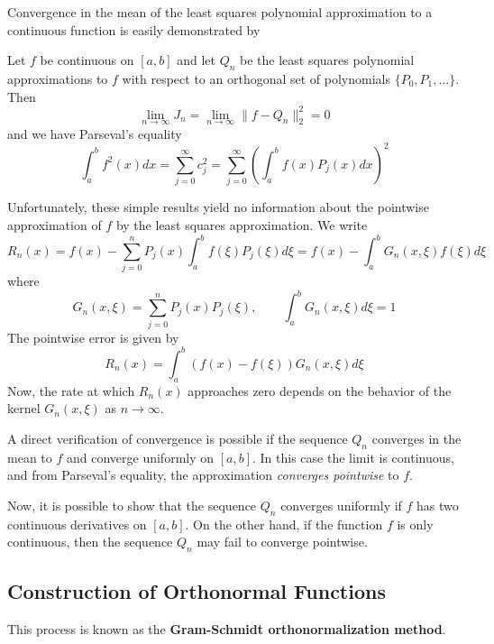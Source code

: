 \documentclass[../main.tex]{subfiles}
\begin{document}
Convergence in the mean of the least squares polynomial approximation to a continuous function is easily demonstrated by
\begin{theorem}{}{}
	Let $f$ be continuous on $[a,b]$ and let $Q_n$ be the least squares polynomial approximations to $f$ with respect to an orthogonal set of polynomials $\{P_0, P_1, \dots\}$. Then
	\begin{equation}
		\lim_{n \to \infty} J_n = \lim_{n \to \infty} \| f - Q_n \|_2^2 = 0
	\end{equation}
	and we have Parseval's equality
	\begin{equation}
		\int_a^b f^2(x) dx = \sum_{j=0}^\infty c_j^2 = \sum_{j=0}^\infty \left( \int_a^b f(x) P_j(x) dx \right)^2
	\end{equation}
\end{theorem}

Unfortunately, these simple results yield no information about the pointwise approximation of $f$ by the least squares approximation. We write
\begin{equation*}
	R_n(x) = f(x) - \sum_{j=0}^n P_j(x) \int_a^b f(\xi) P_j(\xi) d\xi = f(x) - \int_a^b G_n(x, \xi) f(\xi) d\xi
\end{equation*}
where
\begin{equation}
	G_n(x, \xi) = \sum_{j=0}^n P_j(x) P_j(\xi), \qquad \int_a^b G_n(x, \xi) d\xi = 1
\end{equation}
The pointwise error is given by
\begin{equation}
	R_n(x) = \int_a^b (f(x) - f(\xi)) G_n(x, \xi) d\xi
\end{equation}
Now, the rate at which $R_n(x)$ approaches zero depends on the behavior of the kernel $G_n(x, \xi)$ as $n \to \infty$.

A direct verification of convergence is possible if the sequence $Q_n$ converges in the mean to $f$ and converge uniformly on $[a,b]$. In this case the limit is continuous, and from Parseval's equality, the approximation \emph{converges pointwise} to $f$.

Now, it is possible to show that the sequence $Q_n$ converges uniformly if $f$ has two continuous derivatives on $[a,b]$. On the other hand, if the function $f$ is only continuous, then the sequence $Q_n$ may fail to converge pointwise.

\subsection{Construction of Orthonormal Functions}
This process is known as the \textbf{Gram-Schmidt orthonormalization method}.
\end{document}
